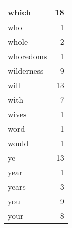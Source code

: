 \begin{center}
\begin{longtable}{l|r}
which & 18 \\ \hline
who & 1 \\ \hline
whole & 2 \\ \hline
whoredoms & 1 \\ \hline
wilderness & 9 \\ \hline
will & 13 \\ \hline
with & 7 \\ \hline
wives & 1 \\ \hline
word & 1 \\ \hline
would & 1 \\ \hline
ye & 13 \\ \hline
year & 1 \\ \hline
years & 3 \\ \hline
you & 9 \\ \hline
your & 8 \\ \hline
\end{longtable}
\end{center}



\normalsize



